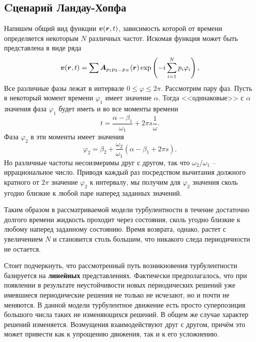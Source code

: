 
\subsection{Cценарий Ландау-Хопфа}

Напишем общий вид функции $\mbox{\boldmath $v$}(\mbox{\boldmath $r$}, t)$, зависимость которой от времени определяется некоторым $N$ различных частот. Искомая функция может быть представлена в виде ряда
\begin{equation}
    \mbox{\boldmath $v$}(\mbox{\boldmath $r$}, t) = \sum \mbox{\boldmath $A$}_{p_1 p_2 \ldots p_N} (\mbox{\boldmath $r$}) \exp \left(-i \sum_{i=1}^{N} p_i \varphi_i \right),
\end{equation}
Все различные фазы лежат в интервале $0 \leq \varphi \leq 2 \pi$. Рассмотрим пару фаз. Пусть в некоторый момент времени $\varphi_1$ имеет значение $\alpha$. Тогда <<одинаковые>> с $\alpha$ значения фаза $\varphi_1$ будет иметь и во все моменты времени
$$
    t = \frac{\alpha - \beta_1}{\omega_1} + 2 \pi s \frac{1}{\omega}.
$$
Фаза $\varphi_2$ в эти моменты имеет значения
$$
\varphi_2 = \beta_2 + \frac{\omega_2}{\omega_1}\left(\alpha - \beta_1 + 2 \pi s\right).
$$
Но различные частоты несоизмеримы друг с другом, так что $\omega_2/\omega_1$ -- иррациональное число. Приводя каждый раз посредством вычитания должного кратного от $2\pi$ значение $\varphi_2$ к интервалу, мы получим для $\varphi_2$ значения сколь угодно близкие к любой паре наперед заданных значений. 

Таким образом в рассматриваемой модели турбулентности в течение достаточно долгого времени жидкость проходит через состояния, сколь угодно близкие к любому наперед заданному состоянию. Время возврата, однако, растет с увеличением $N$ и становится столь большим, что никакого следа периодичности не остается. 

 Стоит подчеркнуть, что рассмотренный путь возникновения турбулентности базируется на \textbf{линейных} представлениях. Фактически предполагалось, что при появлении в результате неустойчивости новых периодических решений уже имевшиеся периодические решения не только не исчезают, но и почти не меняются. В данной модели турбулентное движение есть просто суперпозиция большого числа таких не изменяющихся решений. В общем же случае характер решений изменяется. Возмущения взаимодействуют друг с другом, причём это может привести как к упрощению движения, так и к его усложнению. 


